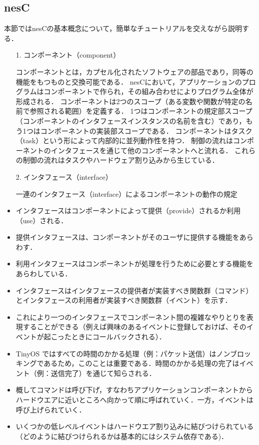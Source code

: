 \documentclass[12pt]{jreport}
\begin{document}
\subsection{nesC}
\label{ssec:nesC}

本節ではnesCの基本概念について，簡単なチュートリアルを交えながら説明する．

\begin{itemize}

 \item[1.] コンポーネント（component）
 
 コンポーネントとは，カプセル化されたソフトウェアの部品であり，同等の機能をもつものと交換可能である．
 nesCにおいて，アプリケーションのプログラムはコンポーネントで作られ，その組み合わせによりプログラム全体が形成される．
 コンポーネントは2つのスコープ（ある変数や関数が特定の名前で参照される範囲）を定義する．
 1つはコンポーネントの規定部スコープ（コンポーネントのインタフェースインスタンスの名前を含む）であり，もう1つはコンポーネントの実装部スコープである．
 コンポーネントはタスク（task）という形によって内部的に並列動作性を持つ．
 制御の流れはコンポーネントのインタフェースを通じて他のコンポーネントへと流れる．
 これらの制御の流れはタスクやハードウェア割り込みから生じている．
 
 \item[2.] インタフェース（interface）

 一連のインタフェース（interface）によるコンポーネントの動作の規定
      \item インタフェースはコンポーネントによって提供（provide）されるか利用（use）される．
      \item 提供インタフェースは、コンポーネントがそのユーザに提供する機能をあらわす．
      \item 利用インタフェースはコンポーネントが処理を行うために必要とする機能をあらわしている．
     \end{itemize}
    \begin{itemize}
      \item インタフェースはインタフェースの提供者が実装すべき関数群（コマンド）とインタフェースの利用者が実装すべき関数群（イベント）を示す．
      \item これにより一つのインタフェースでコンポーネント間の複雑なやりとりを表現することができる（例えば興味のあるイベントに登録しておけば、そのイベントが起こったときにコールバックされる）．
      \item TinyOS ではすべての時間のかかる処理（例：パケット送信）はノンブロッキングであるため，このことは重要である．時間のかかる処理の完了はイベント（例：送信完了）を通じて知らされる．
      \item 概してコマンドは呼び下げ，すなわちアプリケーションコンポーネントからハードウエアに近いところへ向かって順に呼ばれていく．一方，イベントは呼び上げられていく．
      \item いくつかの低レベルイベントはハードウエア割り込みに結びつけられている（どのように結びつけられるかは基本的にはシステム依存である)．
     \end{itemize}
\end{document}
